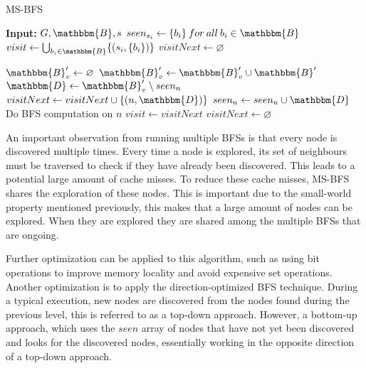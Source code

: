 \begin{algorithm}
\caption{MS-BFS}
\label{alg:msbfs}
\begin{algorithmic}[2]
    \State \textbf{Input:} $G,\mathbbm{B},s$
    \State $seen_{s_i} \leftarrow \{b_i\} \:for \: all \: b_i \in \mathbbm{B}$
    \State $visit \leftarrow \bigcup_{b_i \in \mathbbm{B}}\{(s_i,\{b_i\})\}$
    \State $visitNext \leftarrow \varnothing$
    
            \State $\mathbbm{B}'_v \leftarrow \varnothing$
                \State $\mathbbm{B}'_v \leftarrow \mathbbm{B}'_v \cup \mathbbm{B}'$
            \EndFor
                \State $\mathbbm{D} \leftarrow \mathbbm{B}'_v \setminus seen_n$
                    \State $visitNext \leftarrow visitNext \cup \{(n,\mathbbm{D})\}$
                    \State $seen_n \leftarrow seen_n \cup \mathbbm{D}$
                    \State Do BFS computation on $n$
                \EndIf
            \EndFor
        \EndFor
        \State $visit \leftarrow visitNext$
        \State $visitNext \leftarrow \varnothing$
    \EndWhile   
\end{algorithmic}
\end{algorithm}

An important observation from running multiple BFSs is that every node is discovered multiple times. Every time a node is explored, its set of neighbours must be traversed to check if they have already been discovered. This leads to a potential large amount of cache misses. To reduce these cache misses, MS-BFS shares the exploration of these nodes. This is important due to the small-world property mentioned previously, this makes that a large amount of nodes can be explored. When they are explored they are shared among the multiple BFSs that are ongoing. 

Further optimization can be applied to this algorithm, such as using bit operations to improve memory locality and avoid expensive set operations. Another optimization is to apply the direction-optimized BFS technique. During a typical execution, new nodes are discovered from the nodes found during the previous level, this is referred to as a top-down approach. However, a bottom-up approach, which uses the $seen$ array of nodes that have not yet been discovered and looks for the discovered nodes, essentially working in the opposite direction of a top-down approach. 

